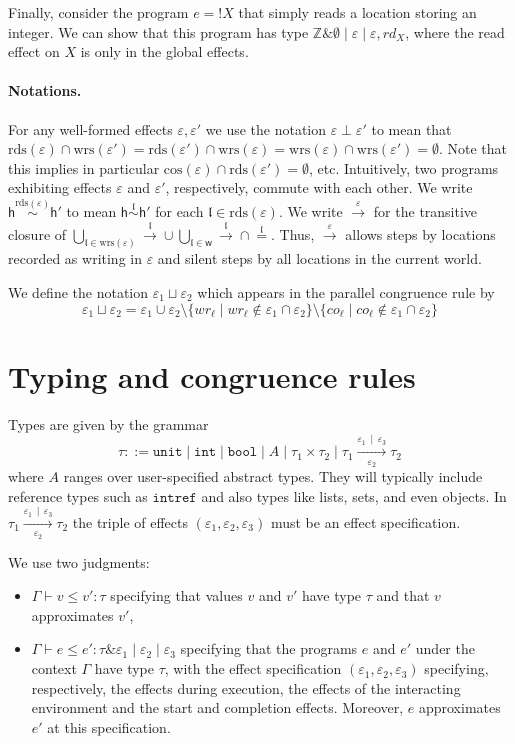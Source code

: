 \documentclass[nocopyrightspace,preprint]{sigplanconf}
\newcommand{\keywd}[1]{\mathtt{#1}}
\newcommand{\myread}[1]{!{#1}}
\newcommand{\myeffto}[3]{\xrightarrow[#2]{#1\,\mid\, #3}}
\newcommand{\ints}{\mathbb{Z}}
\newcommand{\inttype}{\keywd{int}}
\newcommand{\booltype}{\keywd{bool}}
\newcommand{\unittype}{\keywd{unit}}
\newcommand{\rdsin}[1]{\mathrm{rds}({#1})}
\newcommand{\wrsin}[1]{\mathrm{wrs}({#1})}
\newcommand{\eff}{\varepsilon}
\newcommand{\concs}[1]{\mathrm{cos}(#1)}
\newcommand{\rEff}[1]{\ensuremath{\mathit{rd}_{#1}}}
\newcommand{\cEff}[1]{\ensuremath{\mathit{co}_{#1}}}
\newcommand{\wEff}[1]{\ensuremath{\mathit{wr}_{#1}}}
\newcommand{\loc}{\mathfrak{l}}
\newcommand{\cloc}{\ensuremath{X}\xspace}
\newcommand\w{\ensuremath{\mathsf{w}}\xspace}
\newcommand\heap{\ensuremath{\mathsf{h}}\xspace}
\newcommand\h{\heap}
\newcommand{\myety}[4]{{#1}\mathrel{\&}{#2} \mid #3 \mid #4}
\newcommand\rloc[3]{\ensuremath{#1 \stackrel{#3}{\sim} #2}}
\newcommand\rrloc[3]{\ensuremath{#1 \stackrel{#3}{=} #2}}
\newcommand\gloc[3]{\ensuremath{#1 \xrightarrow{#3}#2}}
\begin{document}
Finally, consider the program $e = \myread{\cloc}$ that simply reads a location storing an integer. We can show that this program has type $\myety{\ints}{\emptyset}{\eff}{\eff, \rEff{X}}$, where the read effect on $\cloc$ is only in the global effects. 
 
\paragraph{Notations.}
For any well-formed effects $\eff, \eff'$ we use the notation
$\eff\perp \eff'$ to mean that $\rdsin{\eff} \cap \wrsin{\eff'} =
\rdsin{\eff'} \cap \wrsin{\eff} = \wrsin{\eff} \cap \wrsin{\eff'} =
\emptyset$. Note that this implies in particular
$\concs{\eff}\cap\rdsin{\eff'}=\emptyset$, etc. Intuitively, two
programs exhibiting effects $\eff$ and $\eff'$, respectively, commute
with each other.  We write $\rloc{\h}{\h'}{\rdsin{\eff}}$ to mean
$\rloc{\h}{\h'}{\loc}$ for each $\loc\in \rdsin{\eff}$.  We write
$\gloc{}{}{\eff}$ for the transitive closure of
$\bigcup_{\loc\in\wrsin{\eff}}\gloc{}{}{\loc}\cup\bigcup_{\loc\in\w}\gloc{}{}{\loc}\cap\rrloc{}{}{\loc}$. Thus,
$\gloc{}{}{\eff}$ allows steps by locations recorded as writing in
$\eff$ and silent steps by all locations in the current world.

We define the notation $\eff_1\sqcup\eff_2$ which appears in the parallel congruence rule by
\[
\eff_1\sqcup\eff_2 = \eff_1\cup\eff_2\setminus\{\wEff\ell\mid 
\wEff\ell\not\in\eff_1\cap\eff_2\}\setminus\{\cEff\ell\mid 
\cEff\ell\not\in\eff_1\cap\eff_2\}
\]
\section{Typing and congruence rules}

Types are given by the grammar 
\[
\tau ::= \unittype \mid \inttype\mid \booltype \mid A
\mid\tau_1\times\tau_2\mid 
\tau_1\myeffto{\eff_1}{\eff_2}{\eff_3} \tau_2
\] 
where $A$ ranges over user-specified abstract types. They will typically 
 include reference types such as $\keywd{intref}$
and also types like lists, sets, and even
objects. In $\tau_1\myeffto{\eff_1}{\eff_2}{\eff_3} \tau_2$ the triple of 
effects $(\eff_1,\eff_2,\eff_3)$ must be an effect specification. 

We use two judgments:
\begin{itemize}
\item $\Gamma \vdash v\leq v' : \tau$ specifying that values $v$ and $v'$ have
 type $\tau$ and that $v$ approximates $v'$,
 \item $\Gamma \vdash e\leq e' : \myety{\tau}{\eff_1}{\eff_2}{\eff_3}$ specifying that the programs $e$ and $e'$ 
under the context $\Gamma$ have type $\tau$, with the effect specification $(\eff_1, \eff_2, \eff_3)$ specifying, respectively, the effects during execution, the effects of the interacting environment and the start and completion effects. Moreover, $e$ approximates $e'$ at this specification. 
\end{itemize}
\end{document}
